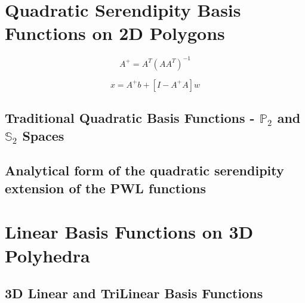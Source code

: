 \section{Quadratic Serendipity Basis Functions on 2D Polygons}
\label{sec::BF_2DQuadratic}

\begin{equation}
\label{eq::BF_2DQuadratic_MP_inv}
A^+ = A^{T} \left(   A A^T \right)^{-1}
\end{equation}

\begin{equation}
\label{eq::BF_2DQuadratic_underdetermined_lin_sol}
x = A^+ b + \left[ I - A^+ A  \right] w
\end{equation}

\subsection{Traditional Quadratic Basis Functions - $\mathbb{P}_{2}$ and $\mathbb{S}_{2}$ Spaces}
\label{sec::BF_2DQuadratic_P2S2}


\subsection{Analytical form of the quadratic serendipity extension of the PWL functions}
\label{sec::BF_2DQuadratic_PWQ}



\section{Linear Basis Functions on 3D Polyhedra}
\label{sec::BF_3DLinear}



\subsection{3D Linear and TriLinear Basis Functions}
\label{sec::BF_3DLinear_TriL}

